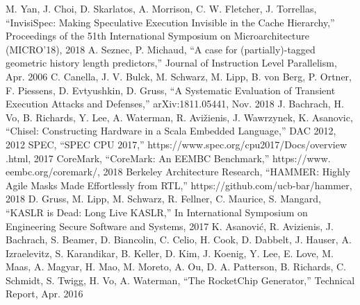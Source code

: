 \begin{thebibliography}{00}
     M. Yan, J. Choi, D. Skarlatos, A. Morrison, C. W. Fletcher, J. Torrellas, ``InvisiSpec: Making Speculative Execution Invisible in the Cache Hierarchy,'' Proceedings of the 51th International Symposium on Microarchitecture (MICRO’18), 2018
     A. Seznec, P. Michaud, ``A case for (partially)-tagged geometric history length predictors,'' Journal of Instruction Level Parallelism, Apr. 2006
     C. Canella, J. V. Bulck, M. Schwarz, M. Lipp, B. von Berg, P. Ortner, F. Piessens, D. Evtyushkin, D. Gruss, ``A Systematic Evaluation of Transient Execution Attacks and Defenses,'' arXiv:1811.05441, Nov. 2018
     J. Bachrach, H. Vo, B. Richards, Y. Lee, A. Waterman, R. Avižienis, J. Wawrzynek, K. Asanovic, ``Chisel: Constructing Hardware in a Scala Embedded Language,'' DAC 2012, 2012
     SPEC, ``SPEC CPU 2017,'' https://www.spec.org/cpu2017/Docs/overview .html, 2017
     CoreMark, ``CoreMark: An EEMBC Benchmark,'' https://www. eembc.org/coremark/, 2018
     Berkeley Architecture Research, ``HAMMER: Highly Agile Masks Made Effortlessly from RTL,'' https://github.com/ucb-bar/hammer, 2018
     D. Gruss, M. Lipp, M. Schwarz, R. Fellner, C. Maurice, S. Mangard, ``KASLR is Dead: Long Live KASLR,'' In International Symposium on Engineering Secure Software and Systems, 2017
     K. Asanović, R. Avizienis, J. Bachrach, S. Beamer, D. Biancolin, C. Celio, H. Cook, D. Dabbelt, J. Hauser, A. Izraelevitz, S. Karandikar, B. Keller, D. Kim, J. Koenig, Y. Lee, E. Love, M. Maas, A. Magyar, H. Mao, M. Moreto, A. Ou, D. A. Patterson, B. Richards, C. Schmidt, S. Twigg, H. Vo, A. Waterman, ``The RocketChip Generator,'' Technical Report, Apr. 2016
\end{thebibliography}

